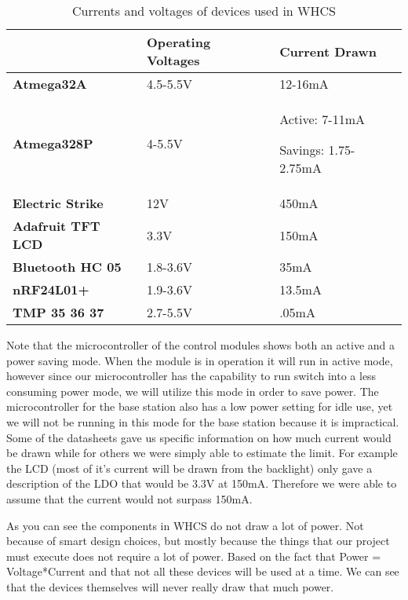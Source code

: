 \begin{table}[H]
\begin{tabular}{|l|l|l|}
\hline
 &
{\color{black} \textbf{Operating Voltages}} &
{\color{black} \textbf{Current Drawn}}\\\hline
{\color{black} \textbf{Atmega32A}} &
{\color{black} 4.5-5.5V } &
{\color{black} 12-16mA}\\\hline
{\color{black} \textbf{Atmega328P}} &
{\color{black} 4-5.5V} &
{\color{black} Active: 7-11mA }

{\color{black} Savings: 1.75-2.75mA}\\\hline
{\color{black} \textbf{Electric Strike }} &
{\color{black} 12V} &
{\color{black} 450mA}\\\hline
{\color{black} \textbf{Adafruit TFT LCD}} &
{\color{black} 3.3V} &
{\color{black} 150mA}\\\hline
{\color{black} \textbf{Bluetooth HC 05}} &
{\color{black} 1.8-3.6V} &
{\color{black} 35mA}\\\hline
{\color{black} \textbf{nRF24L01+}} &
{\color{black} 1.9-3.6V}

 &
{\color{black} 13.5mA}\\\hline
{\color{black} \textbf{TMP 35 36 37 }} &
{\color{black} 2.7-5.5V} &
{\color{black} .05mA}\\\hline
\end{tabular}
\caption{Currents and voltages of devices used in WHCS}
\label{tab:pwr-current}
\end{table}

Note that the microcontroller of the control modules shows both an active and a
power saving mode. When the module is in operation it will run in active mode,
however since our microcontroller has the capability to run switch into a less
consuming power mode, we will utilize this mode in order to save power. The
microcontroller for the base station also has a low power setting for idle use,
yet we will not be running in this mode for the base station because it is
impractical. Some of the datasheets gave us specific information on how much
current would be drawn while for others we were simply able to estimate the
limit. For example the LCD (most of it{}'s current will be drawn from the
backlight) only gave a description of the LDO that would be 3.3V at 150mA.
Therefore we were able to assume that the current would not surpass 150mA.

As you can see the components in WHCS do not draw a lot of power. Not because
of smart design choices, but mostly because the things that our project must
execute does not require a lot of power. Based on the fact that Power =
Voltage*Current and that not all these devices will be used at a time. We can
see that the devices themselves will never really draw that much power.


